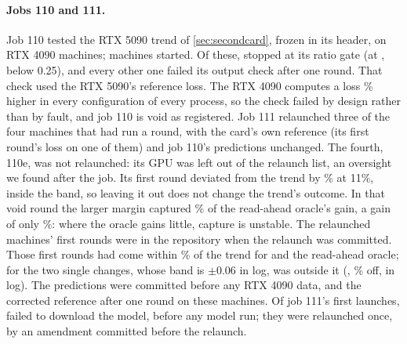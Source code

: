 \paragraph{Jobs 110 and 111.} Job 110 tested the RTX 5090 trend of \cref{sec:secondcard}, frozen in its header, on RTX
4090 machines; \cxTenStarted{} machines started. Of these, \cxTenGated{} stopped at its ratio gate (at
\cxTenGatedRatio, below 0.25), and every other one failed its output check after one round. That check used the RTX
5090's reference loss. The RTX 4090 computes a loss \cxLossDiff\% higher in every configuration of every process, so
the check failed by design rather than by fault, and job 110 is void as registered. Job 111 relaunched three of the
four machines that had run a round, with the card's own reference (its first round's loss on one of them) and job
110's predictions unchanged. The fourth, 110e, was not relaunched: its GPU was left out of the relaunch list, an
oversight we found after the job. Its first round deviated from the trend by \cxNotRelaunchedDev\% at 11\%, inside the band, so
leaving it out does not change the trend's outcome. In that void round the larger margin captured \cxNotRelaunchedCap\% of
the read-ahead oracle's gain, a gain of only \cxNotRelaunchedGain\%: where the oracle gains little, capture is unstable. The relaunched machines' first rounds were in the repository when the
relaunch was committed. Those first rounds had come within \cxFirstDevLowMax\% of the trend for \MinOne{} and the
read-ahead oracle; for the two single changes, whose band is $\pm$0.06 in log, \cxFirstSixOut{} was outside it
(\cxFirstSixName, \cxFirstSixMaxPct\% off, \cxFirstSixMaxLog{} in log). The predictions were committed before any RTX 4090 data, and the corrected reference
after one round on these machines. Of job 111's first launches, \cxElevenNoModel{} failed to download the model,
before any model run; they were relaunched once, by an amendment committed before the relaunch.

